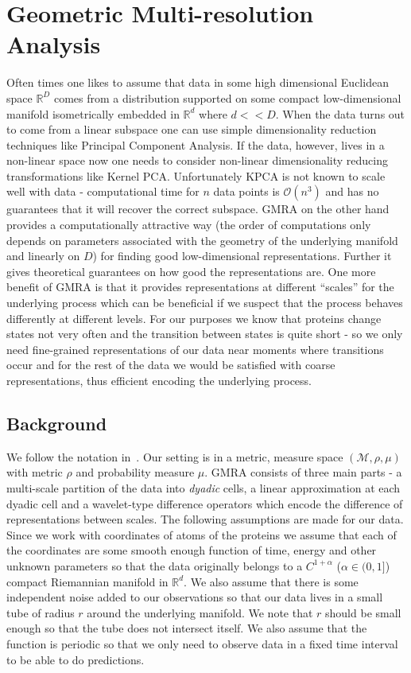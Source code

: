 \documentclass{article}
\begin{document}
\section{Geometric Multi-resolution Analysis}
Often times one likes to assume that data in some high dimensional Euclidean space $\mathbb{R}^D$ comes from a distribution supported on some compact low-dimensional manifold isometrically embedded in $\mathbb{R}^d$ where $d << D$. When the data turns out to come from a linear subspace one can use simple dimensionality reduction techniques like Principal Component Analysis. If the data, however, lives in a non-linear space now one needs to consider non-linear dimensionality reducing transformations like Kernel PCA. Unfortunately KPCA is not known to scale well with data - computational time for $n$ data points is $\mathcal{O}(n^3)$ and has no guarantees that it will recover the correct subspace. GMRA on the other hand provides a computationally attractive way (the order of computations only depends on parameters associated with the geometry of the underlying manifold and linearly on $D$) for finding good low-dimensional representations. Further it gives theoretical guarantees on how good the representations are. One more benefit of GMRA is that it provides representations at different ``scales'' for the underlying process which can be beneficial if we suspect that the process behaves differently at different levels. For our purposes we know that proteins change states not very often and the transition between states is quite short - so we only need fine-grained representations of our data near moments where transitions occur and for the rest of the data we would be satisfied with coarse representations, thus efficient encoding the underlying process.
\subsection{Background}
We follow the notation in~\cite{allard2012multi}. Our setting is in a metric, measure space $\left(\mathcal{M},\rho, \mu\right)$ with metric $\rho$ and probability measure $\mu$. GMRA consists of three main parts - a multi-scale partition of the data into \textit{dyadic} cells, a linear approximation at each dyadic cell and a wavelet-type difference operators which encode the difference of representations between scales. The following assumptions are made for our data. Since we work with coordinates of atoms of the proteins we assume that each of the coordinates are some smooth enough function of time, energy and other unknown parameters so that the data originally belongs to a $C^{1+\alpha}$ ($\alpha \in (0,1]$) compact Riemannian manifold in $\mathbb{R}^d$. We also assume that there is some independent noise added to our observations so that our data lives in a small tube of radius $r$ around the underlying manifold. We note that $r$ should be small enough so that the tube does not intersect itself. We also assume that the function is periodic so that we only need to observe data in a fixed time interval to be able to do predictions.
\end{document}

